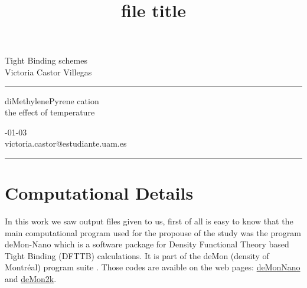 {\setlength{\parindent}{0pt}
\title{file title} %
\fancyhead[C]{}
\begin{minipage}{0.295\textwidth} %
\raggedright
Tight Binding schemes\\ %
\footnotesize %
Victoria Castor Villegas %
\medskip\hrule
\end{minipage}
\begin{minipage}{0.4\textwidth} %
\centering 
\large %
diMethylenePyrene cation\\ %
\normalsize %
the effect of temperature\\ %
\end{minipage}
\begin{minipage}{0.295\textwidth} %
-01-03\\ %
\footnotesize %
victoria.castor@estudiante.uam.es %
\medskip\hrule
\end{minipage}
}

\section{\textbf{Computational Details}}

In this work we saw output files given to us, first of all is easy to know that
the main computational program used for the propouse of the study
was the program deMon-Nano \cite{deMonNano} which is a software package for
Density Functional Theory based Tight Binding (DFTTB) calculations. It is part of the
deMon (density of Montréal) program suite \cite{deMon}. Those codes are avaible on
the web pages: \href{http://demon-nano.ups-tlse.fr}{deMonNano} and
\href{http://www.demon-software.com/public_html/program.html#citations}{deMon2k}.

